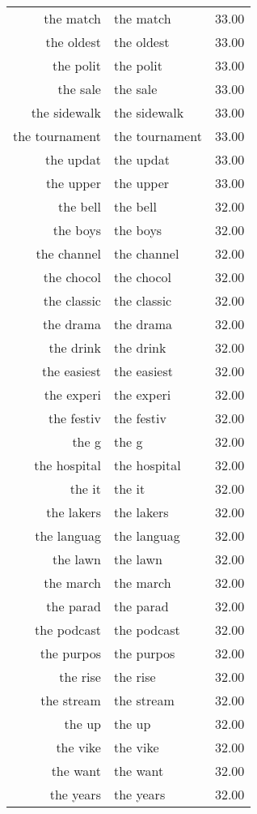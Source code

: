 \begin{table}[ht]
\begin{tabular}{rlr}
  the match & the match & 33.00 \\ 
  the oldest & the oldest & 33.00 \\ 
  the polit & the polit & 33.00 \\ 
  the sale & the sale & 33.00 \\ 
  the sidewalk & the sidewalk & 33.00 \\ 
  the tournament & the tournament & 33.00 \\ 
  the updat & the updat & 33.00 \\ 
  the upper & the upper & 33.00 \\ 
  the bell & the bell & 32.00 \\ 
  the boys & the boys & 32.00 \\ 
  the channel & the channel & 32.00 \\ 
  the chocol & the chocol & 32.00 \\ 
  the classic & the classic & 32.00 \\ 
  the drama & the drama & 32.00 \\ 
  the drink & the drink & 32.00 \\ 
  the easiest & the easiest & 32.00 \\ 
  the experi & the experi & 32.00 \\ 
  the festiv & the festiv & 32.00 \\ 
  the g & the g & 32.00 \\ 
  the hospital & the hospital & 32.00 \\ 
  the it & the it & 32.00 \\ 
  the lakers & the lakers & 32.00 \\ 
  the languag & the languag & 32.00 \\ 
  the lawn & the lawn & 32.00 \\ 
  the march & the march & 32.00 \\ 
  the parad & the parad & 32.00 \\ 
  the podcast & the podcast & 32.00 \\ 
  the purpos & the purpos & 32.00 \\ 
  the rise & the rise & 32.00 \\ 
  the stream & the stream & 32.00 \\ 
  the up & the up & 32.00 \\ 
  the vike & the vike & 32.00 \\ 
  the want & the want & 32.00 \\ 
  the years & the years & 32.00 \\ 

\end{tabular}
\end{table}
